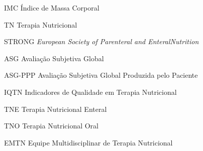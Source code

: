 \begin{siglas}
\item[IMC]{Índice de Massa Corporal}
\item[TN]{Terapia Nutricional}
\item[STRONG]{\textit{European Society of Parenteral and EnteralNutrition}}
\item[ASG]{Avaliação Subjetiva Global}
\item[ASG-PPP]{Avaliação Subjetiva Global Produzida pelo Paciente}
\item[IQTN]{Indicadores de Qualidade em Terapia Nutricional}
\item[TNE]{Terapia Nutricional Enteral}
\item[TNO]{Terapia Nutricional Oral}
\item[EMTN]{Equipe Multidisciplinar de Terapia Nutricional}
\end{siglas}